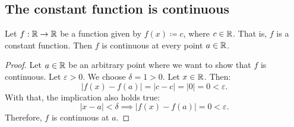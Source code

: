 \subsection{The constant function is continuous}

\begin{theorem}
    Let $f: \mathbb{R} \to \mathbb{R}$ be a function given by $f(x) \coloneqq c$, where $c \in \mathbb{R}$. That is, $f$ is a constant function. Then $f$ is continuous at every point $a \in \mathbb{R}$.
\end{theorem}

\begin{proof}
    Let $a \in \mathbb{R}$ be an arbitrary point where we want to show that $f$ is continuous. Let $\varepsilon > 0$. We choose $\delta = 1 > 0$. Let $x \in \mathbb{R}$. Then:
    \[
        |f(x) - f(a)| = |c - c| = |0| = 0 < \varepsilon.
    \]
    With that, the implication also holds true:
    \[
        |x - a| < \delta \implies |f(x) - f(a)| = 0 < \varepsilon.
    \]
    Therefore, $f$ is continuous at $a$.
\end{proof}
